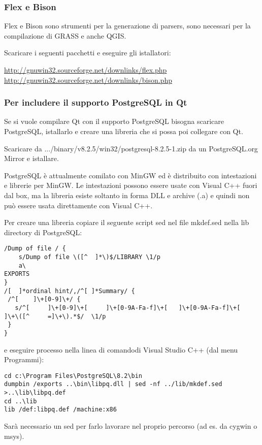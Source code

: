 \subsubsection{Flex e Bison}
Flex e Bison sono strumenti per la generazione di parsers, sono necessari per la compilazione di GRASS e anche QGIS.

Scaricare i seguenti pacchetti e eseguire gli istallatori:

\url{http://gnuwin32.sourceforge.net/downlinks/flex.php} \\
\url{http://gnuwin32.sourceforge.net/downlinks/bison.php}

\subsubsection{Per includere il supporto PostgreSQL in Qt}
Se si vuole compilare Qt con il supporto PostgreSQL bisogna scaricare PostgreSQL, istallarlo e creare una libreria che si possa poi collegare con Qt.

Scaricare da .../binary/v8.2.5/win32/postgresql-8.2.5-1.zip da un
PostgreSQL.org Mirror e istallare.

PostgreSQL è attualmente comilato con MinGW ed è distribuito con intestazioni e librerie per MinGW. Le intestazioni possono essere usate con Visual C++ fuori dal box, ma la libreria esiste soltanto in forma DLL e archive (.a) e quindi non può essere usata direttamente con Visual C++.

Per creare una libreria copiare il seguente script sed nel file mkdef.sed nella lib directory di PostgreSQL:

\begin{verbatim}
/Dump of file / {
	s/Dump of file \([^	 ]*\)$/LIBRARY \1/p
	a\
EXPORTS
}
/[ 	]*ordinal hint/,/^[	]*Summary/ {
 /^[ 	]\+[0-9]\+/ {
   s/^[ 	]\+[0-9]\+[ 	]\+[0-9A-Fa-f]\+[ 	]\+[0-9A-Fa-f]\+[ 	]\+\([^ 	=]\+\).*$/	\1/p
 }
}
\end{verbatim}

e eseguire processo nella linea di comandodi Visual Studio C++ (dal menu Programmi):

\begin{verbatim}
cd c:\Program Files\PostgreSQL\8.2\bin
dumpbin /exports ..\bin\libpq.dll | sed -nf ../lib/mkdef.sed >..\lib\libpq.def
cd ..\lib
lib /def:libpq.def /machine:x86
\end{verbatim}

Sarà necessario un sed per farlo lavorare nel proprio percorso (ad es. da cygwin o msys).

